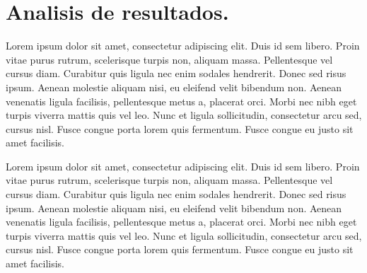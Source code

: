 \documentclass[letter]{article}
\begin{document}
\section{Analisis de resultados.}
Lorem ipsum dolor sit amet, consectetur adipiscing elit. Duis id sem libero. Proin vitae purus rutrum, scelerisque turpis non, aliquam massa. Pellentesque vel cursus diam. Curabitur quis ligula nec enim sodales hendrerit. Donec sed risus ipsum. Aenean molestie aliquam nisi, eu eleifend velit bibendum non. Aenean venenatis ligula facilisis, pellentesque metus a, placerat orci. Morbi nec nibh eget turpis viverra mattis quis vel leo. Nunc et ligula sollicitudin, consectetur arcu sed, cursus nisl. Fusce congue porta lorem quis fermentum. Fusce congue eu justo sit amet facilisis.\par
Lorem ipsum dolor sit amet, consectetur adipiscing elit. Duis id sem libero. Proin vitae purus rutrum, scelerisque turpis non, aliquam massa. Pellentesque vel cursus diam. Curabitur quis ligula nec enim sodales hendrerit. Donec sed risus ipsum. Aenean molestie aliquam nisi, eu eleifend velit bibendum non. Aenean venenatis ligula facilisis, pellentesque metus a, placerat orci. Morbi nec nibh eget turpis viverra mattis quis vel leo. Nunc et ligula sollicitudin, consectetur arcu sed, cursus nisl. Fusce congue porta lorem quis fermentum. Fusce congue eu justo sit amet facilisis.\par


\printbibliography
\end{document}
